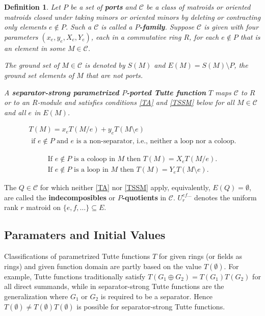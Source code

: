 \documentclass[12pt,leqno]{amsart}
\newtheorem{definition}[lem]{Definition}
\theoremstyle{remark}
\begin{document}
\begin{definition}
\label{SSTMDefinition}
Let $P$ be a set of \textbf{ports} and $\mathcal{C}$ be a class of matroids or
oriented matroids closed under taking minors or oriented minors
by deleting or contracting only elements $e\not\in P$.
Such a $\mathcal{C}$ is called a \textbf{$P$-family}.  
Suppose $\mathcal{C}$ is
given with four parameters $(x_e,y_e,X_e,Y_e)$,
each in a commutative ring $R$, for each $e\not\in P$ that is an element
in some $M\in\mathcal{C}$.

The ground set of $M\in\mathcal{C}$ is denoted by $S(M)$ and
$E(M) = S(M)\setminus P$, the ground set elements of $M$ that are 
not ports.  


A \textbf{separator-strong parametrized $P$-ported Tutte function}
$T$ maps $\mathcal{C}$ to $R$ or to an $R$-module and satisfies 
conditions 
\eqref{TA} and \eqref{TSSM} below for all $M\in\mathcal{C}$ and
all $e$ in $E(M)$.

\begin{equation}
\label{TA}
\tag{TA}
\begin{gathered}
T(M) = x_e T(M/e) + y_e T(M\setminus e) \\
\text{ if $e\not\in P$ and $e$ is a non-separator, 
       i.e., neither a loop nor a coloop.}
\end{gathered}
\end{equation}


\begin{equation}
\label{TSSM}
\tag{TSSM}
\begin{gathered}
\text{If } e\not\in P\text{ is a coloop in }M\text{ then }
T(M)=X_e T(M/e).\\
\text{If } e\not\in P\text{ is a loop in }M\text{ then }
T(M)=Y_e T(M\setminus e).
\end{gathered}
\end{equation}

\end{definition}
The $Q\in \mathcal{C}$ for which neither \eqref{TA} nor
\eqref{TSSM} apply, equivalently, $E(Q)=\emptyset$,
are called the \textbf{indecomposibles} or
\textbf{$P$-quotients} in $\mathcal{C}$.
$U^{ef\ldots}_r$ denotes the uniform rank $r$ matroid 
on $\{e,f,\ldots\}\subseteq E$.

\subsection{Paramaters and Initial Values}

Classifications of parametrized Tutte functions $T$ for
given rings (or fields as rings) and given function domain
are partly based on the value $T(\emptyset)$.  For example,
Tutte functions traditionally satisfy 
$T(G_1\oplus G_2) = T(G_1)T(G_2)$ for all direct summands,
while in \cite{MR93a:05047} separator-strong Tutte functions are
the generalization where $G_1$ or $G_2$ is required to be a
separator.   Hence $T(\emptyset)\neq T(\emptyset)T(\emptyset)$ is 
possible for separator-strong Tutte functions.  
\end{document}
